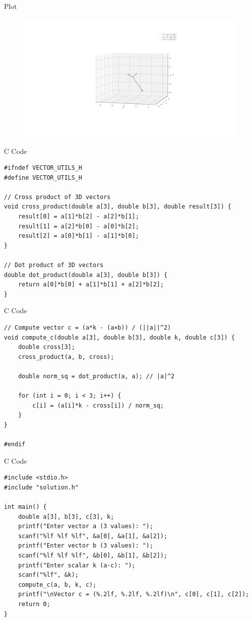 \documentclass{beamer}
\begin{document}
\begin{frame}{Plot}
    \begin{figure}
        \centering
        \includegraphics[width=1\columnwidth]{figs/plot4.png}
        \caption{}
        \label{fig:placeholder}
    \end{figure}
\end{frame}

\begin{frame}[fragile]{C Code}
    \begin{verbatim}
#ifndef VECTOR_UTILS_H
#define VECTOR_UTILS_H

// Cross product of 3D vectors
void cross_product(double a[3], double b[3], double result[3]) {
    result[0] = a[1]*b[2] - a[2]*b[1];
    result[1] = a[2]*b[0] - a[0]*b[2];
    result[2] = a[0]*b[1] - a[1]*b[0];
}

// Dot product of 3D vectors
double dot_product(double a[3], double b[3]) {
    return a[0]*b[0] + a[1]*b[1] + a[2]*b[2];
}
\end{verbatim}
\end{frame}

\begin{frame}[fragile]{C Code}
    \begin{verbatim}
// Compute vector c = (a*k - (a×b)) / (||a||^2)
void compute_c(double a[3], double b[3], double k, double c[3]) {
    double cross[3];
    cross_product(a, b, cross);

    double norm_sq = dot_product(a, a); // |a|^2

    for (int i = 0; i < 3; i++) {
        c[i] = (a[i]*k - cross[i]) / norm_sq;
    }
}

#endif
    \end{verbatim}
\end{frame}

\begin{frame}[fragile]{C Code}
    \begin{verbatim}
#include <stdio.h>
#include "solution.h"

int main() {
    double a[3], b[3], c[3], k;
    printf("Enter vector a (3 values): ");
    scanf("%lf %lf %lf", &a[0], &a[1], &a[2]);
    printf("Enter vector b (3 values): ");
    scanf("%lf %lf %lf", &b[0], &b[1], &b[2]);
    printf("Enter scalar k (a·c): ");
    scanf("%lf", &k);
    compute_c(a, b, k, c);
    printf("\nVector c = (%.2lf, %.2lf, %.2lf)\n", c[0], c[1], c[2]);
    return 0;
}
    \end{verbatim}
\end{frame}
\end{document}
